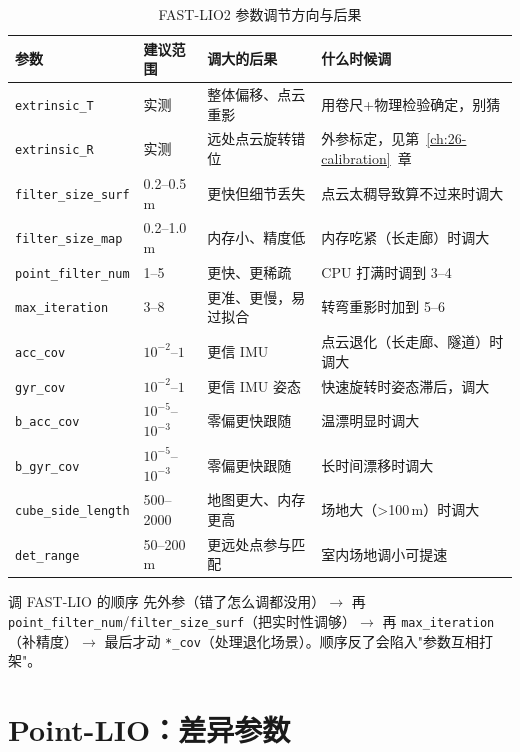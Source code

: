 \begin{table}[htbp]
  \centering
  \caption{FAST-LIO2 参数调节方向与后果}\label{tab:27-fastlio}
  \footnotesize
  \begin{tabular}{p{3.3cm}p{2.6cm}p{3.9cm}p{5.2cm}}
    \toprule
    参数 & 建议范围 & 调大的后果 & 什么时候调 \\
    \midrule
    \lstinline{extrinsic_T} & 实测 & 整体偏移、点云重影 & 用卷尺+物理检验确定，别猜 \\
    \lstinline{extrinsic_R} & 实测 & 远处点云旋转错位 & 外参标定，见第~\ref{ch:26-calibration}~章 \\
    \lstinline{filter_size_surf} & 0.2--0.5\,m & 更快但细节丢失 & 点云太稠导致算不过来时调大 \\
    \lstinline{filter_size_map} & 0.2--1.0\,m & 内存小、精度低 & 内存吃紧（长走廊）时调大 \\
    \lstinline{point_filter_num} & 1--5 & 更快、更稀疏 & CPU 打满时调到 3--4 \\
    \lstinline{max_iteration} & 3--8 & 更准、更慢，易过拟合 & 转弯重影时加到 5--6 \\
    \lstinline{acc_cov} & $10^{-2}$--$1$ & 更信 IMU & 点云退化（长走廊、隧道）时调大 \\
    \lstinline{gyr_cov} & $10^{-2}$--$1$ & 更信 IMU 姿态 & 快速旋转时姿态滞后，调大 \\
    \lstinline{b_acc_cov} & $10^{-5}$--$10^{-3}$ & 零偏更快跟随 & 温漂明显时调大 \\
    \lstinline{b_gyr_cov} & $10^{-5}$--$10^{-3}$ & 零偏更快跟随 & 长时间漂移时调大 \\
    \lstinline{cube_side_length} & 500--2000 & 地图更大、内存更高 & 场地大（>100\,m）时调大 \\
    \lstinline{det_range} & 50--200\,m & 更远处点参与匹配 & 室内场地调小可提速 \\
    \bottomrule
  \end{tabular}
\end{table}

\begin{keybox}{调 FAST-LIO 的顺序}
先外参（错了怎么调都没用）$\to$ 再 \lstinline{point_filter_num}/\lstinline{filter_size_surf}（把实时性调够）$\to$ 再 \lstinline{max_iteration}（补精度）$\to$ 最后才动 \lstinline{*_cov}（处理退化场景）。顺序反了会陷入"参数互相打架"。
\end{keybox}

\section{Point-LIO：差异参数}\label{sec:27-pointlio}

